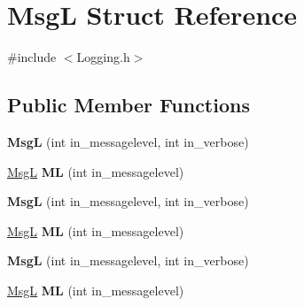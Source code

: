 \hypertarget{structMsgL}{\section{Msg\-L Struct Reference}
\label{structMsgL}
}


{\ttfamily \#include $<$Logging.\-h$>$}

\subsection*{Public Member Functions}
\begin{DoxyCompactItemize}
\item 
\hypertarget{structMsgL_a3db55b36647db334baef366d0be0730c}{{\bfseries Msg\-L} (int in\-\_\-messagelevel, int in\-\_\-verbose)}\label{structMsgL_a3db55b36647db334baef366d0be0730c}

\item 
\hypertarget{structMsgL_afcb7738a46b98d647fc81937af7d0a49}{\hyperlink{structMsgL}{Msg\-L} {\bfseries M\-L} (int in\-\_\-messagelevel)}\label{structMsgL_afcb7738a46b98d647fc81937af7d0a49}

\item 
\hypertarget{structMsgL_a3db55b36647db334baef366d0be0730c}{{\bfseries Msg\-L} (int in\-\_\-messagelevel, int in\-\_\-verbose)}\label{structMsgL_a3db55b36647db334baef366d0be0730c}

\item 
\hypertarget{structMsgL_afcb7738a46b98d647fc81937af7d0a49}{\hyperlink{structMsgL}{Msg\-L} {\bfseries M\-L} (int in\-\_\-messagelevel)}\label{structMsgL_afcb7738a46b98d647fc81937af7d0a49}

\item 
\hypertarget{structMsgL_a3db55b36647db334baef366d0be0730c}{{\bfseries Msg\-L} (int in\-\_\-messagelevel, int in\-\_\-verbose)}\label{structMsgL_a3db55b36647db334baef366d0be0730c}

\item 
\hypertarget{structMsgL_afcb7738a46b98d647fc81937af7d0a49}{\hyperlink{structMsgL}{Msg\-L} {\bfseries M\-L} (int in\-\_\-messagelevel)}\label{structMsgL_afcb7738a46b98d647fc81937af7d0a49}

\end{DoxyCompactItemize}
